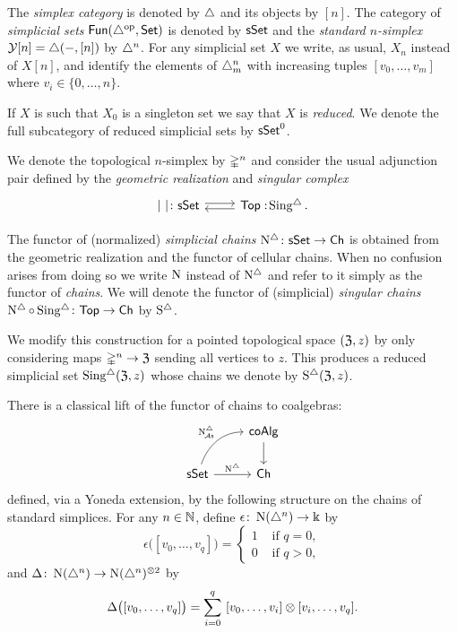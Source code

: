 The \textit{simplex category} is denoted by $\triangle$ and its objects by $[n]$.
The category of \textit{simplicial sets} $\mathsf{Fun}(\triangle^{\mathrm{op}}, \mathsf{Set})$ is denoted by $\mathsf{sSet}$ and the \textit{standard $n$-simplex} $\operatorname{\mathcal{Y}} [n] = \triangle(-, [n])$ by $\triangle^n$.
For any simplicial set $X$ we write, as usual, $X_n$ instead of $X [n]$, and identify the elements of $\triangle^n_m$ with increasing tuples $[v_0, \dots, v_m]$ where $v_i \in \{0, \dots, n\}$.

If $X$ is such that $X_0$ is a singleton set we say that $X$ is \textit{reduced}.
We denote the full subcategory of reduced simplicial sets by $\mathsf{sSet}^0$.

We denote the topological $n$-simplex by $\mathbb{\Delta}^{n}$ and consider the usual adjunction pair defined by the \textit{geometric realization} and \textit{singular complex}
\[
\begin{tikzcd}
	\bars{\ } \colon \sSet  \arrow[r, shift left=.5ex] &
	\Top :\! \sSing. \arrow[l, shift left=.5ex]
\end{tikzcd}
\]

The functor of (normalized) \textit{simplicial chains} $\operatorname{N^{\triangle}} \colon \mathsf{sSet} \to \mathsf{Ch}$ is obtained from the geometric realization and the functor of cellular chains.
When no confusion arises from doing so we write $\operatorname{N}$ instead of $\operatorname{N^{\triangle}}$ and refer to it simply as the functor of \textit{chains}.
We will denote the functor of (simplicial) \textit{singular chains} $\operatorname{N^{\triangle}} \circ \operatorname{Sing^{\triangle}} \colon \mathsf{Top} \to \mathsf{Ch}$ by $\operatorname{S^{\triangle}}$.

We modify this construction for a pointed topological space $(\mathfrak{Z},z)$ by only considering maps $\mathbb{\Delta}^n \to \mathfrak{Z}$ sending all vertices to $z$.
This produces a reduced simplicial set $\operatorname{Sing^{\triangle}}(\mathfrak{Z},z)$ whose chains we denote by $\operatorname{S^{\triangle}}(\mathfrak{Z},z)$.

There is a classical lift of the functor of chains to coalgebras:
\[
\begin{tikzcd}
	& \coAlg \arrow[d] \\
	\sSet \arrow[r, "\schains"] \arrow[ur, "\schainsA", out=70, in=180] & \Ch
\end{tikzcd}
\]
defined, via a Yoneda extension, by the following structure on the chains of standard simplices.
For any $n \in \mathbb{N}$, define $\epsilon \colon \operatorname{N}(\triangle^n) \to \Bbbk$ by
\[
\epsilon \big( [v_0, \dots, v_q] \big) = \begin{cases} 1 & \text{ if } q = 0, \\ 0 & \text{ if } q>0, \end{cases}
\]
and $\Delta \colon \operatorname{N}(\triangle^n) \to \operatorname{N}(\triangle^n)^{\otimes2}$ by
\[
\Delta \big( [v_0, \dots, v_q] \big) = \sum_{i=0}^q \ [v_0, \dots, v_i] \otimes [v_i, \dots, v_q].
\]


